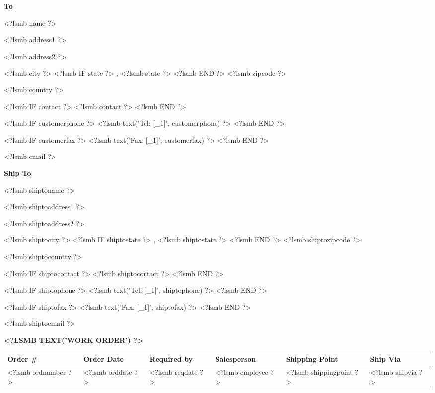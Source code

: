 \parbox[t]{.5\textwidth}{
\textbf{To}
\vspace{0.3cm}

<?lsmb name ?>

<?lsmb address1 ?>

<?lsmb address2 ?>

<?lsmb city ?>
<?lsmb IF state ?>
\hspace{-0.1cm}, <?lsmb state ?>
<?lsmb END ?>
<?lsmb zipcode ?>

<?lsmb country ?>

\vspace{0.3cm}

<?lsmb IF contact ?>
<?lsmb contact ?>
\vspace{0.2cm}
<?lsmb END ?>

<?lsmb IF customerphone ?>
<?lsmb text('Tel: [_1]', customerphone) ?>
<?lsmb END ?>

<?lsmb IF customerfax ?>
<?lsmb text('Fax: [_1]', customerfax) ?>
<?lsmb END ?>

<?lsmb email ?>
}
\parbox[t]{.5\textwidth}{
\textbf{Ship To}
\vspace{0.3cm}

<?lsmb shiptoname ?>

<?lsmb shiptoaddress1 ?>

<?lsmb shiptoaddress2 ?>

<?lsmb shiptocity ?>
<?lsmb IF shiptostate ?>
\hspace{-0.1cm}, <?lsmb shiptostate ?>
<?lsmb END ?>
<?lsmb shiptozipcode ?>

<?lsmb shiptocountry ?>

\vspace{0.3cm}

<?lsmb IF shiptocontact ?>
<?lsmb shiptocontact ?>
\vspace{0.2cm}
<?lsmb END ?>

<?lsmb IF shiptophone ?>
<?lsmb text('Tel: [_1]', shiptophone) ?>
<?lsmb END ?>

<?lsmb IF shiptofax ?>
<?lsmb text('Fax: [_1]', shiptofax) ?>
<?lsmb END ?>

<?lsmb shiptoemail ?>
}
\hfill

\vspace{1cm}

\textbf{\MakeUppercase{<?lsmb text('Work Order') ?>}}
\hfill

\vspace{1cm}

\begin{tabularx}{\textwidth}{*{6}{|X}|} \hline
  \textbf{Order \#} & \textbf{Order Date} & \textbf{Required by} & \textbf{Salesperson} & \textbf{Shipping Point} & \textbf{Ship Via} \\ [0.5em]
  \hline
  <?lsmb ordnumber ?> & <?lsmb orddate ?> & <?lsmb reqdate ?> & <?lsmb employee ?> & <?lsmb shippingpoint ?> & <?lsmb shipvia ?> \\
  \hline
\end{tabularx}


